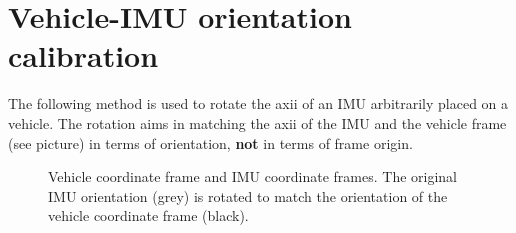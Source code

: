 \documentclass{article}
\begin{document}
		
%		

	\section*{Vehicle-IMU orientation calibration}
	The following method is used to rotate the axii of an IMU arbitrarily placed on a vehicle. The rotation aims in matching the axii of the IMU and the vehicle frame (see picture) in terms of orientation, \textbf{not} in terms of frame origin.
	
	\begin{figure}[!htbp]
		\centering
		\vspace{-0.25cm}
		\caption{Vehicle coordinate frame and IMU coordinate frames. The original IMU orientation (grey) is rotated to match the orientation of the vehicle coordinate frame (black).}
	\end{figure}
	
\end{document}

